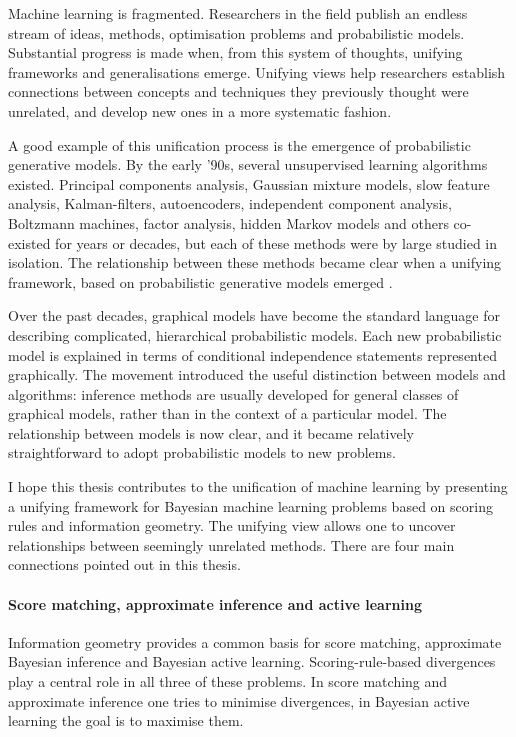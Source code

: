 
Machine learning is fragmented. Researchers in the field publish an endless stream of ideas, methods, optimisation problems and probabilistic models. Substantial progress is made when, from this system of thoughts, unifying frameworks and generalisations emerge. Unifying views help researchers establish connections between concepts and techniques they previously thought were unrelated, and develop new ones in a more systematic fashion.

A good example of this unification process is the emergence of probabilistic generative models. By the early '90s, several unsupervised learning algorithms existed. Principal components analysis, Gaussian mixture models, slow feature analysis, Kalman-filters, autoencoders, independent component analysis, Boltzmann machines, factor analysis, hidden Markov models and others co-existed for years or decades, but each of these methods were by large studied in isolation. The relationship between these methods became clear when a unifying framework, based on probabilistic generative models emerged \citep{Lauritzen1996,Roweis1999,Tipping1999,Turner2007}.

Over the past decades, graphical models \citep{Lauritzen1996} have become the standard language for describing complicated, hierarchical probabilistic models. Each new probabilistic model is explained in terms of conditional independence statements represented graphically. The movement introduced the useful distinction between models and algorithms: inference methods are usually developed for general classes of graphical models, rather than in the context of a particular model. The relationship between models is now clear, and it became relatively straightforward to adopt probabilistic models to new problems.

I hope this thesis contributes to the unification of machine learning by presenting a unifying framework for Bayesian machine learning problems based on scoring rules and information geometry. The unifying view allows one to uncover relationships between seemingly unrelated methods. There are four main connections pointed out in this thesis.

\paragraph{Score matching, approximate inference and active learning} Information geometry provides a common basis for score matching, approximate Bayesian inference and Bayesian active learning. Scoring-rule-based divergences play a central role in all three of these problems. In score matching and approximate inference one tries to minimise divergences, in Bayesian active learning the goal is to maximise them.

